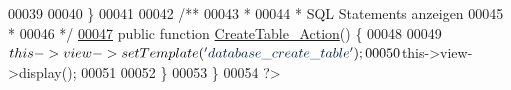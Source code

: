 \begin{DoxyCode}
00039                                 
00040         \}
00041         \textcolor{comment}{}
00042 \textcolor{comment}{        /**}
00043 \textcolor{comment}{         * }
00044 \textcolor{comment}{         * SQL Statements anzeigen}
00045 \textcolor{comment}{         * }
00046 \textcolor{comment}{         */}
\hypertarget{_controller_2_database_8php_source_l00047}{}\hyperlink{class_controller_1_1_database_a81098fd2214f6c2d2378e2613c808ddd}{00047}         \textcolor{keyword}{public} \textcolor{keyword}{function} \hyperlink{class_controller_1_1_database_a81098fd2214f6c2d2378e2613c808ddd}{CreateTable\_Action}() \{
00048                 
00049                 $this->view->setTemplate(\textcolor{stringliteral}{'database\_create\_table'});
00050                 $this->view->display();
00051                                 
00052         \}               
00053 \}
00054 ?>
\end{DoxyCode}
